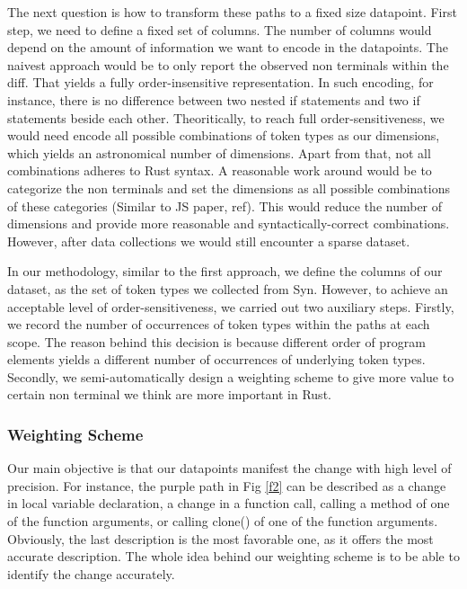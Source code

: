 The next question is how to transform these paths to a fixed size datapoint. First step, we need to define a fixed set of columns. The number of columns would depend on the amount of information we want to encode in the datapoints. The naivest approach would be to only report the observed non terminals within the diff. That yields a fully order-insensitive representation. In such encoding, for instance, there is no difference between two nested if statements and two if statements beside each other. Theoritically, to reach full order-sensitiveness, we would need encode all possible combinations of token types as our dimensions, which yields an astronomical number of dimensions. Apart from that, not all combinations adheres to Rust syntax. A reasonable work around would be to categorize the non terminals and set the dimensions as all possible combinations of these categories (Similar to JS paper, ref). This would reduce the number of dimensions and provide more reasonable and syntactically-correct combinations. However, after data collections we would still encounter a sparse dataset. 

In our methodology, similar to the first approach, we define the columns of our dataset, as the set of token types we collected from Syn. However, to achieve an acceptable level of order-sensitiveness, we carried out two auxiliary steps. Firstly, we record the number of occurrences of token types within the paths at each scope. The reason behind this decision is because different order of program elements yields a different number of occurrences of underlying token types. Secondly, we semi-automatically design a weighting scheme to give more value to certain non terminal we think are more important in Rust.

\subsubsection{Weighting Scheme}

Our main objective is that our datapoints manifest the change with high level of precision. For instance, the purple path in Fig \ref{f2} can be described as a change in local variable declaration, a change in a function call, calling a method of one of the function arguments, or calling clone() of one of the function arguments. Obviously, the last description is the most favorable one, as it offers the most accurate description. The whole idea behind our weighting scheme is to be able to identify the change accurately. 

